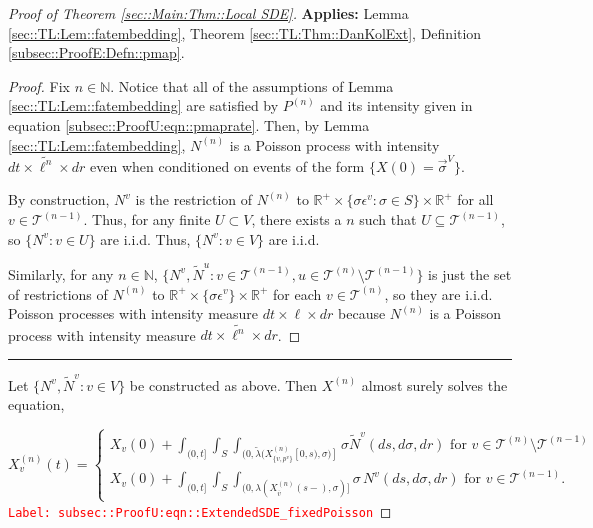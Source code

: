 \documentclass[12pt]{article}
\newcommand{\mb}{\mathbb}
\newcommand{\mc}{\mathcal}
\newcommand{\ov}{\overline}
\newcommand{\te}{\text}
\newcommand{\ep}{\epsilon}
\newcommand{\tr}{\textcolor{red}}
\newcommand{\labe}[1]{\tr{\texttt{Label: #1}}}
\newcommand{\app}{\textbf{Applies: }}
\newcommand{\ind}{\hspace{24pt}}
\newcommand{\lin}{\rule{\linewidth}{0.4 pt}}
\renewcommand{\v}{v}							%
\newcommand{\vv}{u}								%
\renewcommand{\U}{U}							%
\renewcommand{\S}{S}							%
\newcommand{\s}{\sigma}							%
\newcommand{\sv}{\vec{\s}}						%
\newcommand{\ev}{\ep}							%
\renewcommand{\t}{t}							%
\renewcommand{\tt}{s}							%
\newcommand{\X}{X}								%
\newcommand{\vind}[1]{^{#1}}					%
\newcommand{\vsi}[1]{^{#1}}						%
\newcommand{\cind}[1]{_{#1}}					%
\newcommand{\cl}{\ov}							%
\newcommand{\tp}[1]{(#1)}						%
\newcommand{\tip}[1]{#1}						%
\newcommand{\tree}{\mc{T}}						%
\newcommand{\sln}[1]{^{(#1)}}					%
\newcommand{\poiss}{N}							%
\newcommand{\Sm}{\ell}							%
\newcommand{\rate}{\lambda}						%
\renewcommand{\r}{r}							%
\newcommand{\alt}[1]{\widetilde{#1}}			%
\newcommand{\rp}{P}								%
\newcommand{\crate}{\alt{\lambda}}				%
\newcommand{\p}{p}								%
\begin{document}
\begin{proof}[Proof of Theorem \ref{sec::Main:Thm::Local SDE}]
\app Lemma \ref{sec::TL:Lem::fatembedding}, Theorem \ref{sec::TL:Thm::DanKolExt}, Definition \ref{subsec::ProofE:Defn::pmap}.
\begin{proof}

Fix \(n \in \mb{N}\). Notice that all of the assumptions of Lemma \ref{sec::TL:Lem::fatembedding} are satisfied by \(\rp\sln{n}\) and its intensity given in equation \eqref{subsec::ProofU:eqn::pmaprate}. Then, by Lemma \ref{sec::TL:Lem::fatembedding}, \(\poiss\sln{n}\) is a Poisson process with intensity \(d\t\times \alt{\Sm^n}\times d\r\) even when conditioned on events of the form \(\{\X\tp{0} = \sv\vsi{V}\}\).

\ind By construction, \(\poiss\vind{\v}\) is the restriction of \(\poiss\sln{n}\) to \(\mb{R}^+ \times \{\s\ev\vind{\v}: \s\in \S\}\times \mb{R}^+\) for all \(\v\in \tree\sln{n-1}\). Thus, for any finite \(\U \subset V\), there exists a \(n\) such that \(\U \subseteq \tree\sln{n-1}\), so \(\{\poiss\vind{\v}: \v\in \U\}\) are i.i.d. Thus, \(\{\poiss\vind{\v}: \v\in V\}\) are i.i.d.

\ind Similarly, for any \(n \in \mb{N}\), \(\{\poiss\vind{\v},\alt{\poiss}\vind{\vv}: \v \in \tree\sln{n-1},\vv\in\tree\sln{n}\setminus\tree\sln{n-1}\}\) is just the set of restrictions of \(\poiss\sln{n}\) to \(\mb{R}^+\times\{\s\ev\vind{\v}\}\times\mb{R}^+\) for each \(\v\in \tree\sln{n}\), so they are i.i.d. Poisson processes with intensity measure \(d\t\times \Sm\times d\r\) because \(\poiss\sln{n}\) is a Poisson process with intensity measure \(d\t\times\alt{\Sm^n}\times d\r\).
\end{proof}

\lin

Let \(\{\poiss\vind{\v},\alt{\poiss}\vind{\v}:\v\in V\}\) be constructed as above. Then \(\X\sln{n}\) almost surely solves the equation,

\begin{equation}
\X\sln{n}\cind{\v}\tp{\t} = \begin{cases}
\X\cind{\v}\tp{0} + \int_{(0,\t]}\int_\S\int_{(0,\crate(\X\sln{n}\cind{\{\v,\p\vind{\v}\}}\tip{[0,\tt)},\s)]}\s\alt{\poiss}\vind{\v}(d\tt,d\s,d\r)\te{ for } \v \in \tree\sln{n}\setminus\tree\sln{n-1}\\
\X\cind{\v}\tp{0} + \int_{(0,\t]}\int_\S\int_{(0,\rate(\X\sln{n}\cind{\cl{\v}}\tp{\tt-},\s)]}\s\,\poiss\vind{\v}(d\tt,d\s,d\r)\te{ for } \v \in \tree\sln{n-1}.
\end{cases}
\label{subsec::ProofU:eqn::ExtendedSDE_fixedPoisson}
\end{equation}
\labe{subsec::ProofU:eqn::ExtendedSDE\_fixedPoisson}


\end{proof}
\end{document}
